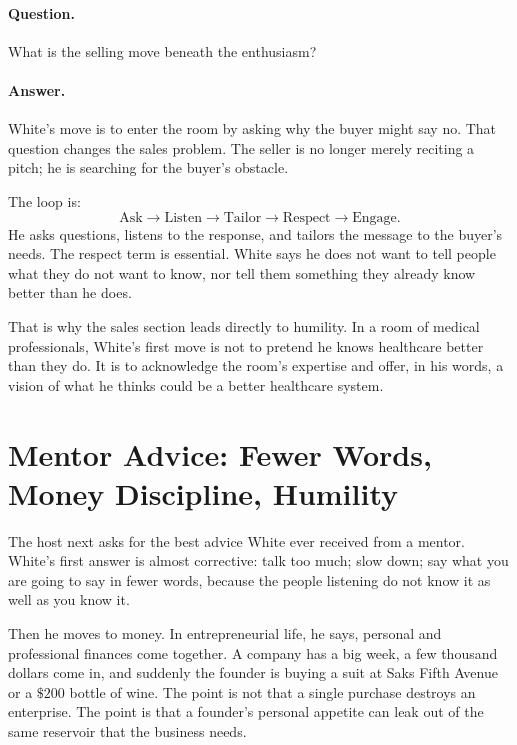 \paragraph{Question.} What is the selling move beneath the enthusiasm?

\paragraph{Answer.} White's move is to enter the room by asking why the buyer might say no. That question changes the sales problem. The seller is no longer merely reciting a pitch; he is searching for the buyer's obstacle.

The loop is:
\begin{equation}
\text{Ask}
\longrightarrow
\text{Listen}
\longrightarrow
\text{Tailor}
\longrightarrow
\text{Respect}
\longrightarrow
\text{Engage}.
\end{equation}
He asks questions, listens to the response, and tailors the message to the buyer's needs. The respect term is essential. White says he does not want to tell people what they do not want to know, nor tell them something they already know better than he does.

That is why the sales section leads directly to humility. In a room of medical professionals, White's first move is not to pretend he knows healthcare better than they do. It is to acknowledge the room's expertise and offer, in his words, a vision of what he thinks could be a better healthcare system.

\section{Mentor Advice: Fewer Words, Money Discipline, Humility}

The host next asks for the best advice White ever received from a mentor. White's first answer is almost corrective: talk too much; slow down; say what you are going to say in fewer words, because the people listening do not know it as well as you know it.

Then he moves to money. In entrepreneurial life, he says, personal and professional finances come together. A company has a big week, a few thousand dollars come in, and suddenly the founder is buying a suit at Saks Fifth Avenue or a \(\$200\) bottle of wine. The point is not that a single purchase destroys an enterprise. The point is that a founder's personal appetite can leak out of the same reservoir that the business needs.

